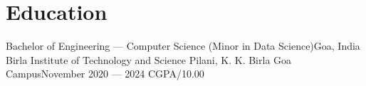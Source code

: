 \section{Education}
  \resumeSubHeadingListStart
    \resumeSubheading
      {Bachelor of Engineering --- Computer Science (Minor in Data Science)}{Goa, India}
      {\vspace{5pt}Birla Institute of Technology and Science Pilani, K. K. Birla Goa Campus}{November 2020 --- 2024} 
      {CGPA/10.00 }
  \resumeSubHeadingListEnd